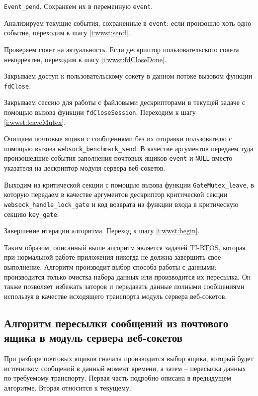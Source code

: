 \begin{enumerate_step}
    \verb|Event_pend|. Сохраняем их в переменную \verb|event|.
    \item Анализируем текущие события, сохраненные в \verb|event|:
    если произошло хоть одно событие, переходим к шагу \ref{i:wwst:send}.
    \item Проверяем сокет на актуальность. Если дескриптор пользовательского
    сокета некорректен, переходим к шагу \ref{i:wwst:fdCloseDone}.
    \item Закрываем доступ к пользовательскому сокету в данном потоке
    вызовом функции \verb|fdClose|.
    \item \label{i:wwst:fdCloseDone} Закрываем сессию для работы с файловыми
    дескрипторами в текущей задаче с помощью вызова функции \verb|fdCloseSession|.
    Переходим к шагу \ref{i:wwst:leaveMutex}.
    \item \label{i:wwst:freeMailBoxOnly} Очищаем почтовые ящики с сообщениями
    без их отправки пользователю с помощью вызова \verb|websock_benchmark_send|.
    В качестве аргументов передаем туда произошедшие события заполнения почтовых
    ящиков \verb|event| и \verb|NULL| вместо указателя на дескриптор модуля
    сервера веб-сокетов.
    \item \label{i:wwst:leaveMutex} Выходим из критической секции с помощью вызова
    функции \verb|GateMutex_leave|, в которую передаем в качестве аргументов
    дескриптор критической секции \verb|websock_handle_lock_gate| и код возврата из
    функции входа в критическую секцию \verb|key_gate|.
    \item Завершение итерации алгоритма. Переход к шагу \ref{i:wwst:begin}.
\end{enumerate_step}

Таким образом, описанный выше алгоритм является задачей TI-RTOS, которая при
нормальной работе приложения никогда не должна завершить свое выполнение.
Алгоритм производит выбор способа работы с данными: производится только очистка
набора данных или производится их пересылка. Он также
позволяет избежать заторов и передавать данные полными сообщениями используя
в качестве исходящего транспорта модуль сервера веб-сокетов.

\subsection{Алгоритм пересылки сообщений из почтового ящика в модуль сервера
веб-сокетов}

При разборе почтовых ящиков сначала производится выбор ящика, который будет
источником сообщений в данный момент времени, а затем -- пересылка данных
по требуемому транспорту. Первая часть подробно описана в предыдущем алгоритме.
Вторая относится к текущему.

